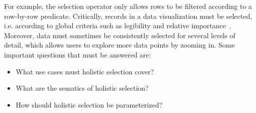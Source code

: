 For example, the selection operator only allows rows to be filtered according to a row-by-row predicate. Critically, records in a data visualization must be selected, i.e. according to global criteria such as legibility and relative importance~\cite{weibel:controls:of:generalization}. Moreover, data must sometimes be consistently selected for several levels of detail, which allows users to explore more data points by zooming in. Some important questions that must be answered are:

\begin{itemize}
\item What use cases must holistic selection cover? 
\item What are the sematics of holistic selection?
\item How should holistic selection be parameterized?
\end{itemize}



